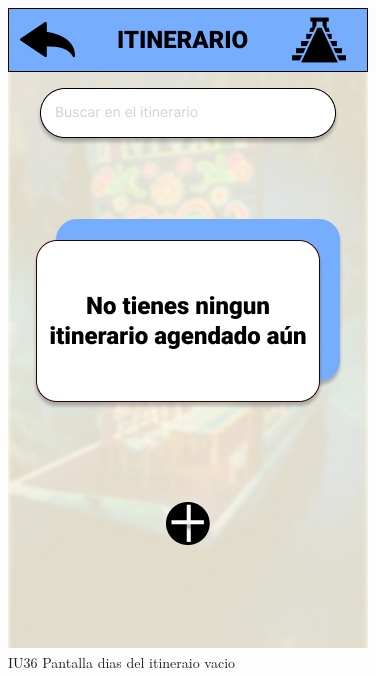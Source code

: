 \begin{figure}[h]
    \begin{minipage}{0.5\textwidth}
        \centering
        \includegraphics[width=.7\linewidth]{Pantallas Prototipo3/IU36-dias del itineraio vacio.jpg}
        \caption{IU36 Pantalla dias del itineraio vacio}
    \end{minipage}%
\end{figure}

